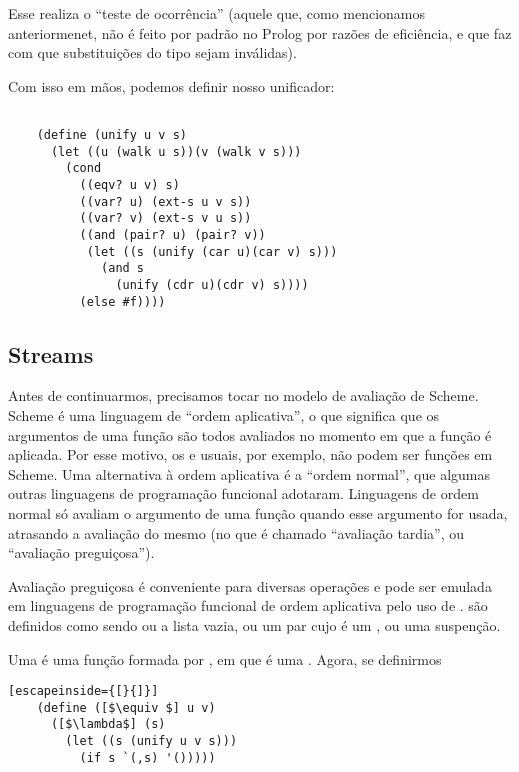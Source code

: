 \documentclass{article}
\begin{document}
  Esse  realiza o ``teste de ocorrência'' (aquele
  que, como mencionamos anteriormenet, não é feito por padrão no
  Prolog por razões de eficiência, e que faz com que substituições do
  tipo  sejam inválidas).

  Com isso em mãos, podemos definir nosso unificador:

  \begin{lstlisting}

    (define (unify u v s)
      (let ((u (walk u s))(v (walk v s)))
        (cond
          ((eqv? u v) s)
          ((var? u) (ext-s u v s))
          ((var? v) (ext-s v u s))
          ((and (pair? u) (pair? v))
           (let ((s (unify (car u)(car v) s)))
             (and s
               (unify (cdr u)(cdr v) s))))
          (else #f))))

  \end{lstlisting}

  \subsection{Streams}

  Antes de continuarmos, precisamos tocar no modelo de avaliação de
  Scheme. Scheme é uma linguagem de ``ordem aplicativa'', o que
  significa que os argumentos de uma função são todos avaliados no
  momento em que a função é aplicada. Por esse motivo, os
   e  usuais, por exemplo, não podem ser
  funções em Scheme. Uma alternativa à ordem aplicativa é a ``ordem
  normal'', que algumas outras linguagens de programação funcional
  adotaram. Linguagens de ordem normal só avaliam o argumento de uma
  função quando esse argumento for usada, atrasando a avaliação do
  mesmo (no que é chamado ``avaliação tardia'', ou ``avaliação
  preguiçosa'').

  Avaliação preguiçosa é conveniente para diversas operações e pode
  ser emulada em linguagens de programação funcional de ordem
  aplicativa pelo uso de .  são
  definidos como sendo ou a lista vazia, ou um par cujo
   é um , ou uma suspenção.

  Uma  é uma função formada por , em que  é uma
  . Agora, se definirmos

  \begin{lstlisting}[escapeinside={[}{]}]
    (define ([$\equiv $] u v)
      ([$\lambda$] (s)
        (let ((s (unify u v s)))
          (if s `(,s) '()))))
  \end{lstlisting}
        
\end{document}
